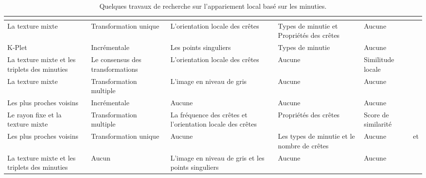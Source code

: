 \begin{sidewaystable}[h!]
\begin{tabular}{|p{4cm}|p{4cm}|p{4cm}|p{3cm}|p{3cm}|p{4cm}|}
\begin{center}
\begin{center}
			\end{center}
		\end{center} \\ \hline
		La texture mixte & Transformation unique & 
		L'orientation locale des crêtes
		& Types de minutie et Propriétés des crêtes & Aucune & \citep{he2003image} \\ \hline
		K-Plet & Incrémentale & Les points singuliers & Types de minutie & Aucune & \citep{chikkerur2005impact} \\ \hline
		La texture mixte et les triplets des minuties & Le consensus des transformations & L'orientation locale des crêtes & Aucune & Similitude locale & \citep{chen2006algorithm} \\ \hline
		La texture mixte & Transformation multiple & L'image en niveau de gris & Aucune & Aucune & \citep{benhammadi2007fingerprint} \\ \hline
		Les plus proches voisins & Incrémentale & Aucune & Aucune & Aucune & \citep{Watson2010} \\ \hline
		Le rayon fixe et la texture mixte & Transformation multiple & La fréquence des crêtes et l'orientation locale des crêtes & Propriétés des crêtes & Score de similarité & \citep{cao2009fingerprint} \\ \hline
		Les plus proches voisins & Transformation unique & Aucune & Les types de minutie et le nombre de crêtes & Aucune & \citep{jiang2000fingerprint} et \citep{bengueddoudj2013improving} \\ \hline
		La texture mixte et les triplets des minuties & Aucun & L'image en niveau de gris et les points singuliers & Aucune & Aucune & \citep{mistry2013fusion} \\ \hline
	\end{tabular}
	\caption{Quelques travaux de recherche sur l'appariement local basé sur les minuties.}%
	\label{tab:chapitre2fingermatching}	
\end{sidewaystable}
\clearpage
